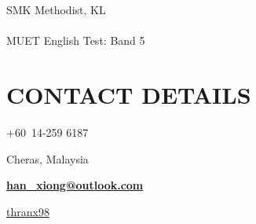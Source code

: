 \documentclass[11pt,A4,english]{article}
\begin{document}
\begin{paracol}{2}
\begin{leftcolumn}
\begin{addmargin}[0em]{0em}
            \hspace{-15pt} \faGraduationCap \hspace{2pt} SMK Methodist, KL \\ \vspace{-.7cm} \\
    
            \hspace{-13pt} \faPencil \hspace{5pt} MUET English Test: Band 5 \\ 

        \end{addmargin}

    \vspace{0cm}

    \section{CONTACT DETAILS}

    \vspace{-.25em}

        \begin{addmargin}[0em]{0em}

            \vspace{2pt}

            \hspace{4pt} \faPhone \hspace{6pt} +60\ 14-259 6187 

            \vspace{4pt}

            \hspace{-12pt} \faMapMarker \hspace{8pt} Cheras, Malaysia 

            \vspace{4pt}

            \hspace{-14pt} \faEnvelope \hspace{6pt} \bf{\href{mailto:han\_xiong@outlook.com}{han\_xiong@outlook.com} } 

            \vspace{4pt}

            \hspace{-13.25pt} \faLinkedinSquare \hspace{6pt} \href{https://www.linkedin.com/in/thranx98}{thranx98}
            
            \vspace{4pt}


\end{addmargin}
\end{leftcolumn}
\end{paracol}
\end{document}

